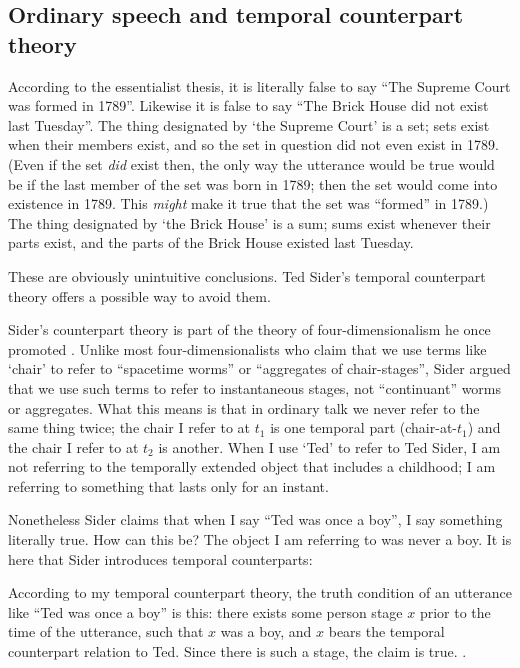 \documentclass[11pt]{article}
\newenvironment{squote}{%
\begin{spacing}{1}
\begin{list}{}{%
\setlength{\labelwidth}{0pt}%
\rightmargin\leftmargin%
}
\item\relax
}{%
\end{list}%
\end{spacing}
}
\begin{document}
\begin{spacing}{1.5}
\subsection{Ordinary speech and temporal counterpart theory}
\label{counterpart}
According to the essentialist thesis, it is literally false to say
``The Supreme Court was formed in 1789''.  Likewise it is false to say
``The Brick House did not exist last Tuesday''.  The thing designated
by `the Supreme Court' is a set; sets exist when their members exist,
and so the set in question did not even exist in 1789.  (Even if the
set {\em did} exist then, the only way the utterance would be true
would be if the last member of the set was born in 1789; then the set
would come into existence in 1789.  This {\em might} make it true that
the set was ``formed'' in 1789.)  The thing designated by `the Brick
House' is a sum; sums exist whenever their parts exist, and the parts
of the Brick House existed last Tuesday.

These are obviously unintuitive conclusions.  Ted Sider's temporal
counterpart theory offers a possible way to avoid them.

Sider's counterpart theory is part of the theory of
four-dimensionalism he once promoted \citeyearpar{sider2001}.  Unlike
most four-dimensionalists who claim that we use terms like `chair' to
refer to ``spacetime worms'' or ``aggregates of chair-stages'', Sider
argued that we use such terms to refer to instantaneous stages, not
``continuant'' worms or aggregates.  What this means is that in
ordinary talk we never refer to the same thing twice; the chair I
refer to at $t_1$ is one temporal part (chair-at-$t_1$) and the chair
I refer to at $t_2$ is another.  When I use `Ted' to refer to Ted
Sider, I am not referring to the temporally extended object that
includes a childhood; I am referring to something that lasts only for
an instant.

Nonetheless Sider claims that when I say ``Ted was once a boy'', I say
something literally true.  How can this be?  The object I am referring
to was never a boy.  It is here that Sider introduces temporal
counterparts:

\begin{squote}
According to my temporal counterpart theory, the truth condition of an
utterance like ``Ted was once a boy'' is this: there exists some
person stage $x$ prior to the time of the utterance, such that $x$ was
a boy, and $x$ bears the temporal counterpart relation to Ted.  Since
there is such a stage, the claim is
true. \citeyearpar[193]{sider2001}.
\end{squote}


\end{spacing}
\end{document}
